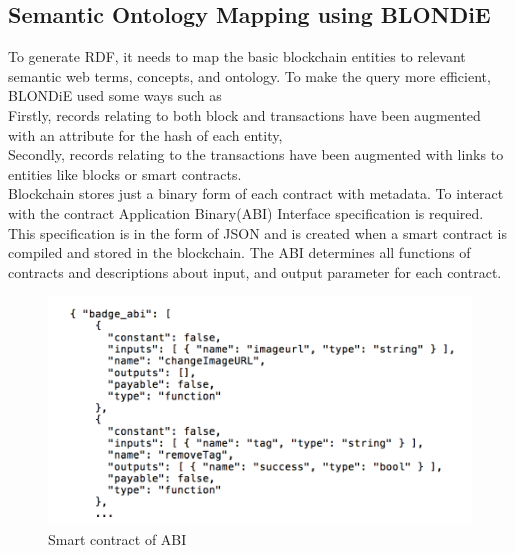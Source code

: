\subsection{Semantic Ontology Mapping using BLONDiE} 
To generate RDF, it needs to map the basic blockchain entities to relevant semantic web terms, concepts, and ontology. To make the query more efficient, BLONDiE used some ways such as \\  
Firstly, records relating to both block and transactions have been
augmented with an attribute for the hash of each entity,   \\
Secondly, records relating to the transactions have been augmented with links to entities like blocks or smart contracts.\\
Blockchain stores just a binary form of each contract with metadata.   
To interact with the contract Application Binary(ABI) Interface specification is required. This specification is in the form of JSON and is created when a smart contract is compiled and stored in the blockchain. The ABI determines all functions of contracts and descriptions about input, and output parameter for each contract\cite{Third}.

\begin{center}
	\begin{figure}[htb!]
		
		\begin{minipage}{0.55\linewidth}
			\centering
			\includegraphics[width=1.95\textwidth]{images/chap02_SmartContract_ABI.png}
		\end{minipage}
		\caption[Smart contract of ABI]{Smart  contract of ABI}
		
	\end{figure}
	
\end{center}



